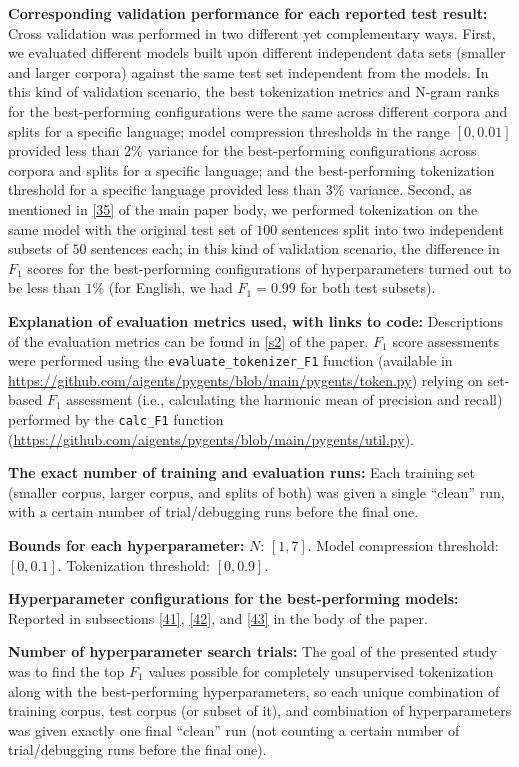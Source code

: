 \documentclass[11pt]{article}
\begin{document}
\textbf{Corresponding validation performance for each reported test result:} Cross validation was performed in two different yet complementary ways. First, we evaluated different models built upon different independent data sets (smaller and larger corpora) against the same test set independent from the models. In this kind of validation scenario, the best tokenization metrics and N-gram ranks for the best-performing configurations were the same across different corpora and splits for a specific language; model compression thresholds in the range $[0,0.01]$ provided less than $2$\% variance for the best-performing configurations across corpora and splits for a specific language; and the best-performing tokenization threshold for a specific language provided less than $3$\% variance. Second, as mentioned in \autoref{35} of the main paper body, we performed tokenization on the same model with the original test set of $100$ sentences split into two independent subsets of $50$ sentences each; in this kind of validation scenario, the difference in $F_1$ scores for the best-performing configurations of hyperparameters turned out to be less than $1$\% (for English, we had $F_1 = 0.99$ for both test subsets).

\textbf{Explanation of evaluation metrics used, with links to code:} Descriptions of the evaluation metrics can be found in \autoref{s2} of the paper. $F_1$ score assessments were performed using the \texttt{evaluate\_tokenizer\_F1} function (available in \url{https://github.com/aigents/pygents/blob/main/pygents/token.py}) relying on set-based $F_1$ assessment (i.e., calculating the harmonic mean of precision and recall) performed by the \texttt{calc\_F1} function (\url{https://github.com/aigents/pygents/blob/main/pygents/util.py}). 

\textbf{The exact number of training and evaluation runs:} Each training set (smaller corpus, larger corpus, and splits of both) was given a single “clean” run, with a certain number of trial/debugging runs before the final one.  

\textbf{Bounds for each hyperparameter:} $N$: $[1,7]$. Model compression threshold: $[0,0.1]$. Tokenization threshold: $[0,0.9]$.

\textbf{Hyperparameter configurations for the best-performing models:} Reported in subsections \ref{41}, \ref{42}, and \ref{43} in the body of the paper.

\textbf{Number of hyperparameter search trials:} The goal of the presented study was to find the top $F_1$ values possible for completely unsupervised tokenization along with the best-performing hyperparameters, so each unique combination of training corpus, test corpus (or subset of it), and combination of hyperparameters was given exactly one final “clean” run (not counting a certain number of trial/debugging runs before the final one).
\end{document}
